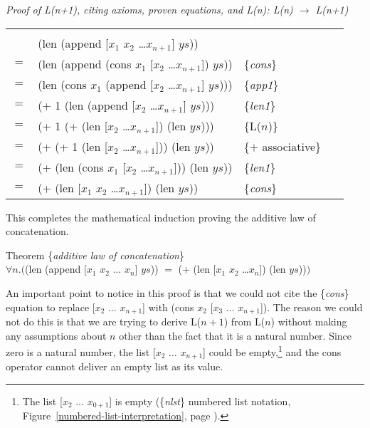 \begin{center}
\emph{Proof of L(n+1), citing axioms, proven equations, and L(n): L(n) $\rightarrow$ L(n+1)}\\
\begin{tabular}{llll}
\hline\\[-1.0em]
    & \textsf{(len (append [$x_1$ $x_2$ \dots $x_{n+1}$] $ys$))}         &                     &~\\
$=$ & \textsf{(len (append (cons $x_1$ [$x_2$ \dots $x_{n+1}$]) $ys$))}  & \{\emph{cons}\}     &~\\
$=$ & \textsf{(len (cons $x_1$ (append [$x_2$ \dots $x_{n+1}$] $ys$)))}  & \{\emph{app1}\}     &~\\
$=$ & \textsf{(+ 1 (len (append [$x_2$ \dots $x_{n+1}$] $ys$)))}         & \{\emph{len1}\}     &~\\
$=$ & \textsf{(+ 1 (+ (len [$x_2$ \dots $x_{n+1}$]) (len $ys$)))}        & \{L($n$)\}          &~\\
$=$ & \textsf{(+ (+ 1 (len [$x_2$ \dots $x_{n+1}$])) (len $ys$))}        & \{$+$ associative\} &~\\
$=$ & \textsf{(+ (len (cons $x_1$ [$x_2$ \dots $x_{n+1}$])) (len $ys$))} & \{\emph{len1}\}     &~\\
$=$ & \textsf{(+ (len [$x_1$ $x_2$ \dots $x_{n+1}$]) (len $ys$))}        & \{\emph{cons}\}     &~\\
\end{tabular}
\end{center}

This completes the mathematical induction proving the
additive law of concatenation.
\begin{samepage}
\begin{center}
\label{additive-law-concatenation}
Theorem \{\emph{additive law of concatenation}\} \\
$\forall n.($\textsf{(len (append [$x_1$ $x_2$ $\dots$ $x_n$] $ys$))}
$=$ \textsf{(+ (len [$x_1$ $x_2$ \dots $x_n$]) (len $ys$))}$)$
\end{center}
\end{samepage}

An important point to notice in this proof is that
we could not cite the \{\emph{cons}\} equation to replace \textsf{[$x_2$ $\dots$ $x_{n+1}$]}
with \textsf{(cons $x_2$ [$x_3$ $\dots$ $x_{n+1}$])}.
The reason we could not do this is that we are trying to derive
L($n+1$) from L($n$) without making any assumptions about $n$
other than the fact that it is a natural number.
Since zero is a natural number, the list \textsf{[$x_2$ $\dots$ $x_{n+1}$]}
could be empty,\footnote{The list [$x_2$ $\dots$ $x_{0+1}$] is empty
(\{\emph{nlst}\} numbered list notation,
Figure~\ref{numbered-list-interpretation}, page \pageref{numbered-list-interpretation}).}
and the \textsf{cons} operator cannot deliver an empty list as its value.


